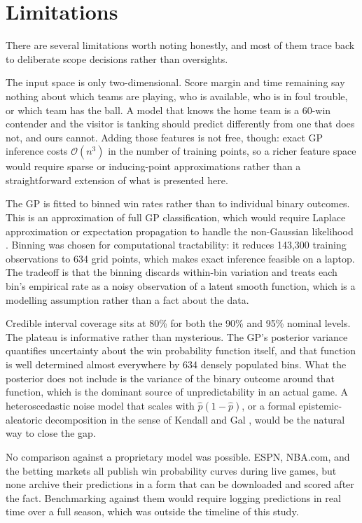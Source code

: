 \documentclass[conference]{IEEEtran}
\begin{document}
\section{Limitations}

There are several limitations worth noting honestly, and most of them trace back to deliberate scope decisions rather than oversights.

The input space is only two-dimensional. Score margin and time remaining say nothing about which teams are playing, who is available, who is in foul trouble, or which team has the ball. A model that knows the home team is a 60-win contender and the visitor is tanking should predict differently from one that does not, and ours cannot. Adding those features is not free, though: exact GP inference costs $\mathcal{O}(n^3)$ in the number of training points, so a richer feature space would require sparse or inducing-point approximations rather than a straightforward extension of what is presented here.

The GP is fitted to binned win rates rather than to individual binary outcomes. This is an approximation of full GP classification, which would require Laplace approximation or expectation propagation to handle the non-Gaussian likelihood \cite{rasmussen2006}. Binning was chosen for computational tractability: it reduces 143,300 training observations to 634 grid points, which makes exact inference feasible on a laptop. The tradeoff is that the binning discards within-bin variation and treats each bin's empirical rate as a noisy observation of a latent smooth function, which is a modelling assumption rather than a fact about the data.

Credible interval coverage sits at 80\% for both the 90\% and 95\% nominal levels. The plateau is informative rather than mysterious. The GP's posterior variance quantifies uncertainty about the win probability function itself, and that function is well determined almost everywhere by 634 densely populated bins. What the posterior does not include is the variance of the binary outcome around that function, which is the dominant source of unpredictability in an actual game. A heteroscedastic noise model that scales with $\hat{p}(1-\hat{p})$, or a formal epistemic-aleatoric decomposition in the sense of Kendall and Gal \cite{kendall2017}, would be the natural way to close the gap.

No comparison against a proprietary model was possible. ESPN, NBA.com, and the betting markets all publish win probability curves during live games, but none archive their predictions in a form that can be downloaded and scored after the fact. Benchmarking against them would require logging predictions in real time over a full season, which was outside the timeline of this study.
\end{document}
